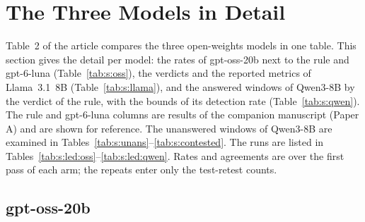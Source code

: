 \section{The Three Models in Detail}
\label{sec:s:open}

Table~2 of the article compares the three open-weights models in one table. This section gives the detail per model: the rates of gpt-oss-20b next to the rule and gpt-6-luna (Table~\ref{tab:s:oss}), the verdicts and the reported metrics of Llama~3.1~8B (Table~\ref{tab:s:llama}), and the answered windows of Qwen3-8B by the verdict of the rule, with the bounds of its detection rate (Table~\ref{tab:s:qwen}). The rule and gpt-6-luna columns are results of the companion manuscript (Paper A) and are shown for reference. The unanswered windows of Qwen3-8B are examined in Tables~\ref{tab:s:unans}--\ref{tab:s:contested}. The runs are listed in Tables~\ref{tab:s:led:oss}--\ref{tab:s:led:qwen}. Rates and agreements are over the first pass of each arm; the repeats enter only the test-retest counts.

\subsection{gpt-oss-20b}
\label{sec:s:open:oss}

